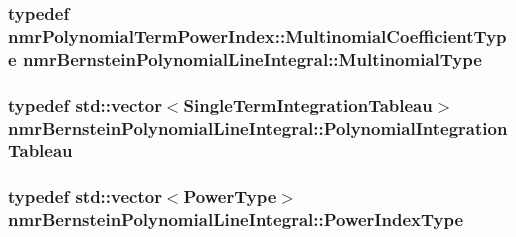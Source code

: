 \subsubsection[{Multinomial\+Type}]{\setlength{\rightskip}{0pt plus 5cm}typedef {\bf nmr\+Polynomial\+Term\+Power\+Index\+::\+Multinomial\+Coefficient\+Type} {\bf nmr\+Bernstein\+Polynomial\+Line\+Integral\+::\+Multinomial\+Type}}\label{classnmr_bernstein_polynomial_line_integral_a284a932e77c5c38a5d6959c4992d5300}
\hypertarget{classnmr_bernstein_polynomial_line_integral_a60deb00991c5e0971d60280bcbb7a405}{}
\subsubsection[{Polynomial\+Integration\+Tableau}]{\setlength{\rightskip}{0pt plus 5cm}typedef std\+::vector$<${\bf Single\+Term\+Integration\+Tableau}$>$ {\bf nmr\+Bernstein\+Polynomial\+Line\+Integral\+::\+Polynomial\+Integration\+Tableau}\hspace{0.3cm}{\ttfamily [protected]}}\label{classnmr_bernstein_polynomial_line_integral_a60deb00991c5e0971d60280bcbb7a405}
\hypertarget{classnmr_bernstein_polynomial_line_integral_a16dae5a5a7adabc4c3356c857aeb3841}{}
\subsubsection[{Power\+Index\+Type}]{\setlength{\rightskip}{0pt plus 5cm}typedef std\+::vector$<${\bf Power\+Type}$>$ {\bf nmr\+Bernstein\+Polynomial\+Line\+Integral\+::\+Power\+Index\+Type}\hspace{0.3cm}{\ttfamily [protected]}}\label{classnmr_bernstein_polynomial_line_integral_a16dae5a5a7adabc4c3356c857aeb3841}
\hypertarget{classnmr_bernstein_polynomial_line_integral_a0e07aee2cb7c5f3f5d2c1f95cd4e9abf}{}

